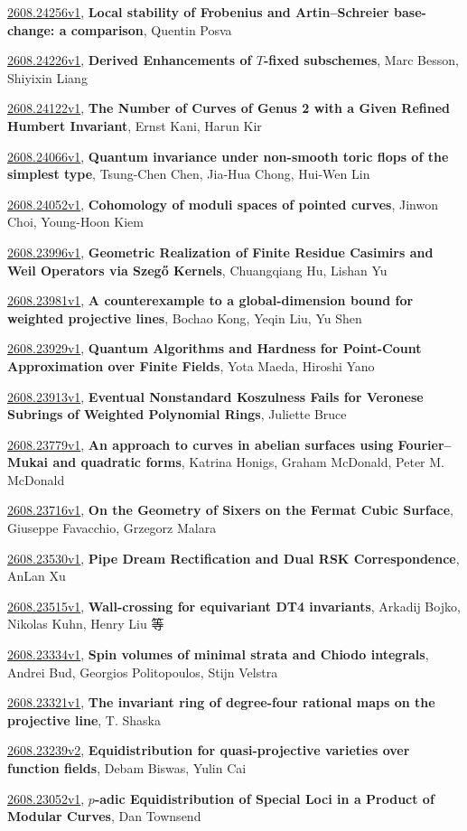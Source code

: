 \documentclass[9pt, a4paper]{article}
\theoremstyle{plain}
\theoremstyle{definition}
\theoremstyle{remark}
\newcommand{\arxiv}[3]{\href{https://arxiv.org/abs/#1}{#1}, \textbf{\textcolor{arxivblue}{#2}}, #3}
\begin{document}
\arxiv{2608.24256v1}{Local stability of Frobenius and Artin--Schreier base-change: a comparison}{Quentin Posva}

\arxiv{2608.24226v1}{Derived Enhancements of $T$-fixed subschemes}{Marc Besson, Shiyixin Liang}

\arxiv{2608.24122v1}{The Number of Curves of Genus 2 with a Given Refined Humbert Invariant}{Ernst Kani, Harun Kir}

\arxiv{2608.24066v1}{Quantum invariance under non-smooth toric flops of the simplest type}{Tsung-Chen Chen, Jia-Hua Chong, Hui-Wen Lin}

\arxiv{2608.24052v1}{Cohomology of moduli spaces of pointed curves}{Jinwon Choi, Young-Hoon Kiem}

\arxiv{2608.23996v1}{Geometric Realization of Finite Residue Casimirs and Weil Operators via Szegő Kernels}{Chuangqiang Hu, Lishan Yu}

\arxiv{2608.23981v1}{A counterexample to a global-dimension bound for weighted projective lines}{Bochao Kong, Yeqin Liu, Yu Shen}

\arxiv{2608.23929v1}{Quantum Algorithms and Hardness for Point-Count Approximation over Finite Fields}{Yota Maeda, Hiroshi Yano}

\arxiv{2608.23913v1}{Eventual Nonstandard Koszulness Fails for Veronese Subrings of Weighted Polynomial Rings}{Juliette Bruce}

\arxiv{2608.23779v1}{An approach to curves in abelian surfaces using Fourier--Mukai and quadratic forms}{Katrina Honigs, Graham McDonald, Peter M. McDonald}

\arxiv{2608.23716v1}{On the Geometry of Sixers on the Fermat Cubic Surface}{Giuseppe Favacchio, Grzegorz Malara}

\arxiv{2608.23530v1}{Pipe Dream Rectification and Dual RSK Correspondence}{AnLan Xu}

\arxiv{2608.23515v1}{Wall-crossing for equivariant DT4 invariants}{Arkadij Bojko, Nikolas Kuhn, Henry Liu 等}

\arxiv{2608.23334v1}{Spin volumes of minimal strata and Chiodo integrals}{Andrei Bud, Georgios Politopoulos, Stijn Velstra}

\arxiv{2608.23321v1}{The invariant ring of degree-four rational maps on the projective line}{T. Shaska}

\arxiv{2608.23239v2}{Equidistribution for quasi-projective varieties over function fields}{Debam Biswas, Yulin Cai}

\arxiv{2608.23052v1}{$p$-adic Equidistribution of Special Loci in a Product of Modular Curves}{Dan Townsend}
\end{document}
